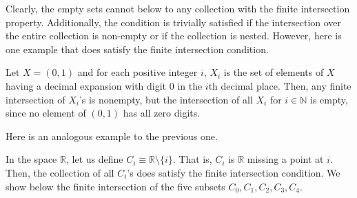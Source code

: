 \documentclass{article}
\begin{document}
    Clearly, the empty sets cannot below to any collection with the finite intersection property. Additionally, the condition is trivially satisfied if the intersection over the entire collection is non-empty or if the collection is nested. However, here is one example that does satisfy the finite intersection condition. 

    \begin{example}
    Let $X = (0,1)$ and for each positive integer $i$, $X_i$ is the set of elements of $X$ having a decimal expansion with digit $0$ in the $i$th decimal place. Then, any finite intersection of $X_i$'s is nonempty, but the intersection of all $X_i$ for $i \in \mathbb{N}$ is empty, since no element of $(0,1)$ has all zero digits. 
    \end{example}

    Here is an analogous example to the previous one. 
    \begin{example}
    In the space $\mathbb{R}$, let us define $C_i \equiv \mathbb{R} \setminus \{i\}$. That is, $C_i$ is $\mathbb{R}$ missing a point at $i$. Then, the collection of all $C_i$'s does satisfy the finite intersection condition. We show below the finite intersection of the five subsets $C_0, C_1, C_2, C_3, C_4$. 
    \begin{center}
    \end{center}
    \end{example}
\end{document}
